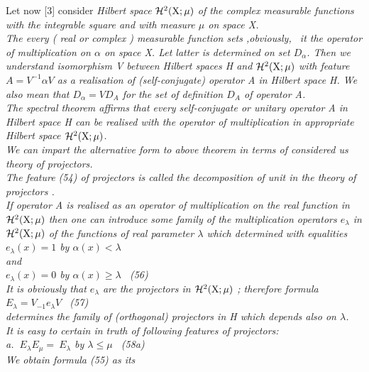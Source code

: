 \documentclass[a4paper,12pt] {article}
\begin{document}
{Let now [3] consider  { \it Hilbert space }  $ \cal H \rm ^2 ( X;\mu)$  \it  of  the complex measurable
 functions with the integrable square and with measure   $ \mu $  \it on space \rm  X.
\\ The every ( real or complex ) measurable function sets ,obviously,  {\ it the operator of multiplication
on} $ \alpha $ \it  on  space \rm  X. Let latter is determined on set  $ D_{\alpha }$. Then we understand
  \it  isomorphism \rm  V  \it  between Hilbert spaces \rm   H \it and  $ \cal H \rm ^2 ( X;\mu)$  \it  with
 feature  $ A= V^{-1} \alpha V$    \it  as a  realisation  of (self-conjugate)  operator \rm  A  \it in Hilbert
 space \rm  H. We also mean that  $ D_{\alpha }= V D_A $ for the set of definition  $D_A $ of operator
A.\\ \it The spectral theorem \rm affirms that  \it every self-conjugate or unitary operator \rm  A  \it in
Hilbert space \rm   H  \it  can be realised with the operator of multiplication in  appropriate Hilbert space \rm
$\cal H \rm ^2 ( X;\mu) $. \\ We  can impart the alternative form to above  theorem in  terms of considered
 us theory of projectors.\\ The feature (54) of  projectors is called  \it  the decomposition of unit \rm in
the theory of projectors .\\ If operator A is realised as an operator of multiplication on the \it  real \rm
function in $\cal H \rm ^2 ( X;\mu) $  then one can introduce  \it some family of the  multiplication
 operators \rm $ e_\lambda $  in $\cal H \rm ^2 ( X;\mu) $  \it of the functions of real parameter  \rm
$ \lambda $  which determined with equalities \\$ e_{\lambda} (x) =1 $ by $ \alpha (x)< \lambda $ \\
and \\$ e_{\lambda} (x) =0 $ by   $ \alpha (x) \ge  \lambda $
\ (56)
\\ It is obviously that  $ e_{\lambda }$ are the  \it projectors \rm in  $\cal H \rm  ^2 ( X;\mu) $ ; therefore
formula \\ $ E_ \lambda = V_{-1} e_{\lambda} V $ \ (57) \\ determines  \it the family of (orthogonal)
 projectors in \rm  H  \it which depends also on \rm  $ \lambda $.\\ It is easy to certain in truth of
following features of projectors:\\
a. $ \ E_\lambda  E_\mu =\ E_\lambda $ by $ \lambda \le \mu $ \  (58a)\\ We obtain formula  (55) as its
}
\end{document}
